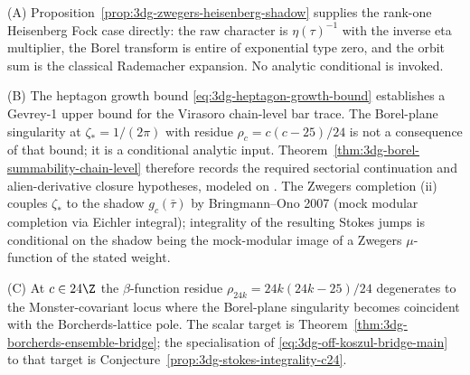 \begin{remark}
\textup{(A)} Proposition~\ref{prop:3dg-zwegers-heisenberg-shadow}
supplies the rank-one Heisenberg Fock case directly: the raw character
is $\eta(\tau)^{-1}$ with the inverse eta multiplier, the Borel
transform is entire of exponential type zero, and the orbit sum is the
classical Rademacher expansion. No analytic conditional is invoked.

\textup{(B)} The heptagon growth bound
\eqref{eq:3dg-heptagon-growth-bound} establishes a Gevrey-1 upper
bound for the Virasoro chain-level bar trace. The Borel-plane
singularity at $\zeta_{\ast} = 1/(2\pi)$ with residue
$\rho_{c} = c(c - 25)/24$ is not a consequence of that bound; it is a
conditional analytic input. Theorem~\ref{thm:3dg-borel-summability-chain-level}
therefore records the required sectorial continuation and
alien-derivative closure hypotheses, modeled on
\cite[Thm.~3.1]{AnicetoSchiappa2015}. The
Zwegers completion \textup{(ii)} couples $\zeta_{\ast}$ to the
shadow $g_{c}(\bar\tau)$ by Bringmann--Ono 2007 (mock modular
completion via Eichler integral); integrality of the resulting
Stokes jumps is conditional on the shadow being the mock-modular
image of a Zwegers $\mu$-function of the stated weight.

\textup{(C)} At \(c\in24\Z\) the \(\beta\)-function residue
\(\rho_{24k}=24k(24k-25)/24\) degenerates to the Monster-covariant
locus where the Borel-plane singularity becomes coincident with the
Borcherds-lattice pole. The scalar target is
Theorem~\ref{thm:3dg-borcherds-ensemble-bridge}; the specialisation
of \eqref{eq:3dg-off-koszul-bridge-main} to that target is
Conjecture~\ref{prop:3dg-stokes-integrality-c24}.
\end{remark}

